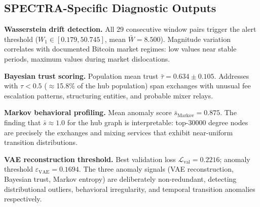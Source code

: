 \documentclass[journal]{IEEEtran}
\begin{document}
\subsection{SPECTRA-Specific Diagnostic Outputs}
\label{subsec:spectra_outputs}

\textbf{Wasserstein drift detection.}
All \num{29} consecutive window pairs trigger the alert threshold
($W_1 \in [0.179, 50.745]$, mean $\bar{W} = \num{8.500}$).
Magnitude variation correlates with documented Bitcoin market regimes: low
values near stable periods, maximum values during market dislocations.

\textbf{Bayesian trust scoring.}
Population mean trust $\bar{\tau} = \num{0.634} \pm \num{0.105}$.
Addresses with $\tau < 0.5$ ($\approx$\num{15.8}\% of the hub population)
span exchanges with unusual fee escalation patterns, structuring entities,
and probable mixer relays.

\textbf{Markov behavioral profiling.}
Mean anomaly score $\bar{s}_{\text{Markov}} = \num{0.875}$.
The finding that $\bar{s} \approx 1.0$ for the hub graph is interpretable:
top-\num{30000} degree nodes are precisely the exchanges and mixing services
that exhibit near-uniform transition distributions.

\textbf{VAE reconstruction threshold.}
Best validation loss $\mathcal{L}_{\text{val}} = \num{0.2216}$;
anomaly threshold $\varepsilon_{\text{VAE}} = \num{0.1694}$.
The three anomaly signals (VAE reconstruction, Bayesian trust, Markov entropy)
are deliberately non-redundant, detecting distributional outliers, behavioral
irregularity, and temporal transition anomalies respectively.
\end{document}
